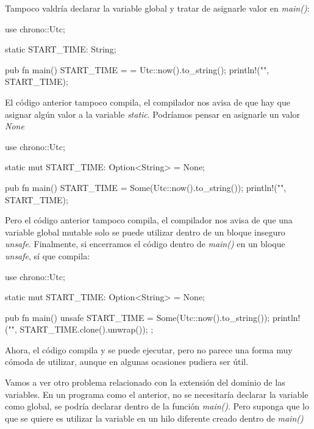 Tampoco valdría declarar la variable global y tratar de asignarle valor en \textit{main()}:

\vspace{0.7em}
\begin{Codigo}
   use chrono::Utc;
   
   static START_TIME: String;
   
   pub fn main() {
      START_TIME =  = Utc::now().to_string();
      println!("{}", START_TIME);
   }
\end{Codigo}

El código anterior tampoco compila, el compilador nos avisa de que hay que asignar algún valor a la variable \textit{static}. Podríamos pensar en asignarle un valor \textit{None}

\vspace{0.7em}
\begin{Codigo}
   use chrono::Utc;
   
   static mut START_TIME: Option<String> = None;
   
   pub fn main() {
      START_TIME = Some(Utc::now().to_string());
      println!("{}", START_TIME);
   }	
\end{Codigo}

Pero el código anterior tampoco compila, el compilador nos avisa de que una variable global mutable solo se puede utilizar dentro de un bloque inseguro \textit{unsafe{}}. Finalmente, si encerramos el código dentro de \textit{main()} en un bloque \textit{unsafe{}}, sí que compila:

\begin{Codigo}
   use chrono::Utc;
   
   static mut START_TIME: Option<String> = None;
   
   pub fn main() {
      unsafe{
         START_TIME =  Some(Utc::now().to_string());
         println!("{}",  START_TIME.clone().unwrap());
      };
   }
\end{Codigo}

Ahora, el código compila y se puede ejecutar, pero no parece una forma muy cómoda de utilizar, aunque en algunas ocasiones pudiera ser útil.

Vamos a ver otro problema relacionado con la extensión del dominio de las variables. En un programa como el anterior, no se necesitaría declarar la variable como global, se podría declarar dentro de la función \textit{main()}. Pero suponga que lo que se quiere es utilizar la variable en un hilo diferente creado dentro de \textit{main()}


